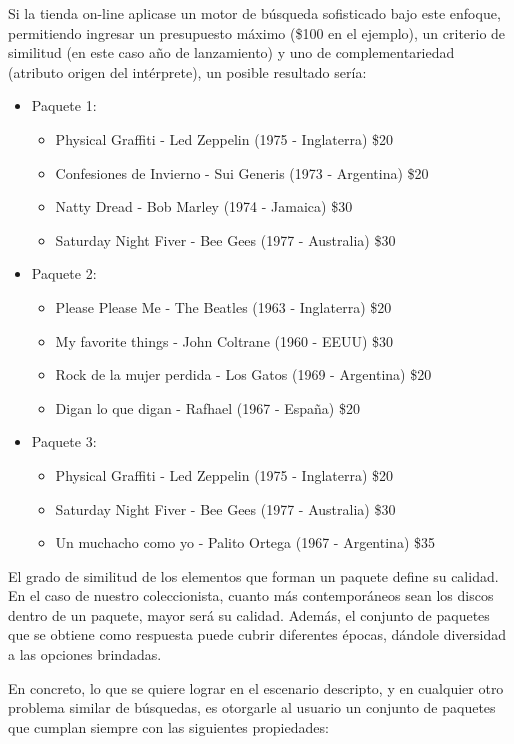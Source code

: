 Si la tienda on-line aplicase un motor de búsqueda sofisticado bajo este enfoque, permitiendo ingresar un presupuesto máximo (\$100 en el ejemplo), un criterio de similitud (en este caso año de lanzamiento) y uno de complementariedad (atributo origen del intérprete), un posible resultado sería:

\begin{itemize}
  \item Paquete 1:
  \begin{itemize}
    \item Physical Graffiti - Led Zeppelin (1975 - Inglaterra) \$20
    \item Confesiones de Invierno - Sui Generis (1973 - Argentina) \$20
    \item Natty Dread - Bob Marley (1974 - Jamaica) \$30
		\item Saturday Night Fiver - Bee Gees (1977 - Australia) \$30
  \end{itemize}
  \item Paquete 2:
  \begin{itemize}
	  \item Please Please Me - The Beatles (1963 - Inglaterra) \$20
	  \item My favorite things - John Coltrane (1960 - EEUU) \$30
	  \item Rock de la mujer perdida - Los Gatos (1969 - Argentina) \$20
		\item Digan lo que digan - Rafhael (1967 - España) \$20
  \end{itemize}
	  \item Paquete 3:
  \begin{itemize}
	  \item Physical Graffiti - Led Zeppelin (1975 - Inglaterra) \$20
		\item Saturday Night Fiver - Bee Gees (1977 - Australia) \$30
	  \item Un muchacho como yo - Palito Ortega (1967 - Argentina) \$35
  \end{itemize}
\end{itemize}


El grado de similitud de los elementos que forman un paquete define su calidad. En el caso de nuestro coleccionista, cuanto 
más contemporáneos sean los discos dentro de un paquete, mayor será su calidad. Además, el conjunto de paquetes que se obtiene como respuesta puede cubrir diferentes épocas, dándole diversidad a las opciones brindadas. 

En concreto, lo que se quiere lograr en el escenario descripto, y en cualquier otro problema similar de búsquedas, es otorgarle al usuario un conjunto de paquetes que cumplan siempre con las siguientes propiedades: 

